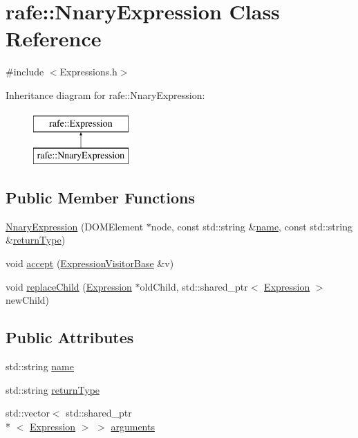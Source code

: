 \hypertarget{classrafe_1_1_nnary_expression}{\section{rafe\+:\+:Nnary\+Expression Class Reference}
\label{classrafe_1_1_nnary_expression}
}


{\ttfamily \#include $<$Expressions.\+h$>$}

Inheritance diagram for rafe\+:\+:Nnary\+Expression\+:\begin{figure}[H]
\begin{center}
\leavevmode
\includegraphics[height=2.000000cm]{classrafe_1_1_nnary_expression}
\end{center}
\end{figure}
\subsection*{Public Member Functions}
\begin{DoxyCompactItemize}
\item 
\hyperlink{classrafe_1_1_nnary_expression_ab136f6b504e0c3523bd2e6a929022d58}{Nnary\+Expression} (D\+O\+M\+Element $\ast$node, const std\+::string \&\hyperlink{classrafe_1_1_nnary_expression_a14fbf6f0dd20a40e6ea647a1223e5362}{name}, const std\+::string \&\hyperlink{classrafe_1_1_nnary_expression_a220fa9d75003ecbadc3c3b365e5c8603}{return\+Type})
\item 
void \hyperlink{classrafe_1_1_nnary_expression_a69364332f3ee37e38901cdef923c6eeb}{accept} (\hyperlink{classrafe_1_1_expression_visitor_base}{Expression\+Visitor\+Base} \&v)
\item 
void \hyperlink{classrafe_1_1_nnary_expression_a3e7adc7e9dc45caa0a6ac3919564a921}{replace\+Child} (\hyperlink{classrafe_1_1_expression}{Expression} $\ast$old\+Child, std\+::shared\+\_\+ptr$<$ \hyperlink{classrafe_1_1_expression}{Expression} $>$ new\+Child)
\end{DoxyCompactItemize}
\subsection*{Public Attributes}
\begin{DoxyCompactItemize}
\item 
std\+::string \hyperlink{classrafe_1_1_nnary_expression_a14fbf6f0dd20a40e6ea647a1223e5362}{name}
\item 
std\+::string \hyperlink{classrafe_1_1_nnary_expression_a220fa9d75003ecbadc3c3b365e5c8603}{return\+Type}
\item 
std\+::vector$<$ std\+::shared\+\_\+ptr\\*
$<$ \hyperlink{classrafe_1_1_expression}{Expression} $>$ $>$ \hyperlink{classrafe_1_1_nnary_expression_af78598eb1a4c75a90204a85aa2292313}{arguments}
\end{DoxyCompactItemize}
